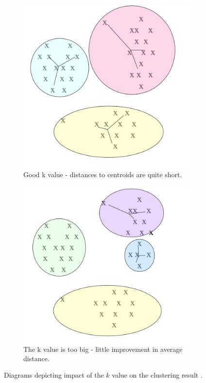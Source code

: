 \begin{figure}[b]
\begin{subfigure}[t]{0.30\textwidth}
                \includegraphics[width=\textwidth]{Figures/justright}
                \caption{Good k value - distances to centroids are quite short.}
                \label{fig:justright}
        \end{subfigure}
         \begin{subfigure}[t]{0.30\textwidth}
                \includegraphics[width=\textwidth]{Figures/overfitting}
                \caption{The k value is too big - little improvement in average distance.}
                \label{fig:overfitting}
        \end{subfigure}
          \caption{Diagrams depicting impact of the $k$ value on the clustering result \cite{kcluster}.}
        \label{fig:kmeansclustering}
\end{figure}

